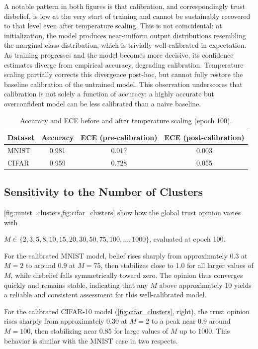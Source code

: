A notable pattern in both figures is that calibration, and correspondingly trust disbelief, is low at the very start of training and cannot be sustainably recovered to that level even after temperature scaling. This is not coincidental: at initialization, the model produces near-uniform output distributions resembling the marginal class distribution, which is trivially well-calibrated in expectation. As training progresses and the model becomes more decisive, its confidence estimates diverge from empirical accuracy, degrading calibration. Temperature scaling partially corrects this divergence post-hoc, but cannot fully restore the baseline calibration of the untrained model. This observation underscores that calibration is not solely a function of accuracy: a highly accurate but overconfident model can be less calibrated than a naive baseline.
\begin{table}[h]
\centering
\caption{Accuracy and \ac{ECE} before and after temperature
scaling (epoch 100).}
\label{tab:ece}
\begin{tabular}{lccc}
\toprule
\textbf{Dataset} & \textbf{Accuracy}  & \textbf{\ac{ECE} (pre-calibration)} & \textbf{\ac{ECE} (post-calibration)} \\
\midrule
MNIST        & 0.981 & 0.017 & 0.003 \\
CIFAR        & 0.959 & 0.728 & 0.055 \\
\bottomrule
\end{tabular}
\end{table}
\subsection{Sensitivity to the Number of Clusters}
\label{subsec:clusters}
\cref{fig:mnist_clusters,fig:cifar_clusters} show how the global trust opinion varies with 

\noindent
$M \in \{2, 3, 5, 8, 10, 15, 20, 30, 50, 75, 100, \ldots, 1000\}$, evaluated at epoch 100.

For the calibrated MNIST model, belief rises sharply from approximately 0.3 at $M=2$ to around 0.9 at $M=75$, then stabilizes close to 1.0 for all larger values of $M$, while disbelief falls symmetrically toward zero. The opinion thus converges quickly and remains stable, indicating that any $M$ above approximately 10 yields a reliable and consistent assessment for this well-calibrated model. 

For the calibrated CIFAR-10 model (\cref{fig:cifar_clusters}, right), the trust opinion rises sharply from approximately 0.30 at $M=2$ to a peak near 0.9 around $M=100$, then stabilizing near 0.85 for large values of $M$ up to 1000. This behavior is similar with the MNIST case in two respects. 

